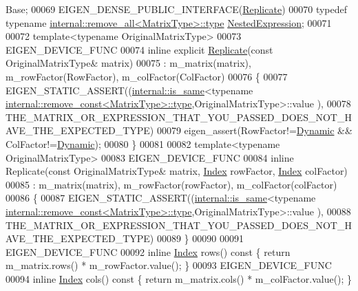 \begin{DoxyCode}
      Base;
00069     EIGEN\_DENSE\_PUBLIC\_INTERFACE(\hyperlink{group___core___module_class_eigen_1_1_replicate}{Replicate})
00070     \textcolor{keyword}{typedef} \textcolor{keyword}{typename} \hyperlink{group___sparse_core___module}{internal::remove\_all<MatrixType>::type} 
      \hyperlink{group___sparse_core___module}{NestedExpression};
00071 
00072     \textcolor{keyword}{template}<\textcolor{keyword}{typename} OriginalMatrixType>
00073     EIGEN\_DEVICE\_FUNC
00074     \textcolor{keyword}{inline} \textcolor{keyword}{explicit} \hyperlink{group___core___module_class_eigen_1_1_replicate}{Replicate}(\textcolor{keyword}{const} OriginalMatrixType& matrix)
00075       : m\_matrix(matrix), m\_rowFactor(RowFactor), m\_colFactor(ColFactor)
00076     \{
00077       EIGEN\_STATIC\_ASSERT((\hyperlink{struct_eigen_1_1internal_1_1is__same}{internal::is\_same}<\textcolor{keyword}{typename} 
      \hyperlink{group___sparse_core___module}{internal::remove\_const<MatrixType>::type},OriginalMatrixType>::value
      ),
00078                           THE\_MATRIX\_OR\_EXPRESSION\_THAT\_YOU\_PASSED\_DOES\_NOT\_HAVE\_THE\_EXPECTED\_TYPE)
00079       eigen\_assert(RowFactor!=\hyperlink{namespace_eigen_ad81fa7195215a0ce30017dfac309f0b2}{Dynamic} && ColFactor!=\hyperlink{namespace_eigen_ad81fa7195215a0ce30017dfac309f0b2}{Dynamic});
00080     \}
00081 
00082     \textcolor{keyword}{template}<\textcolor{keyword}{typename} OriginalMatrixType>
00083     EIGEN\_DEVICE\_FUNC
00084     \textcolor{keyword}{inline} Replicate(\textcolor{keyword}{const} OriginalMatrixType& matrix, \hyperlink{namespace_eigen_a62e77e0933482dafde8fe197d9a2cfde}{Index} rowFactor, 
      \hyperlink{namespace_eigen_a62e77e0933482dafde8fe197d9a2cfde}{Index} colFactor)
00085       : m\_matrix(matrix), m\_rowFactor(rowFactor), m\_colFactor(colFactor)
00086     \{
00087       EIGEN\_STATIC\_ASSERT((\hyperlink{struct_eigen_1_1internal_1_1is__same}{internal::is\_same}<\textcolor{keyword}{typename} 
      \hyperlink{group___sparse_core___module}{internal::remove\_const<MatrixType>::type},OriginalMatrixType>::value
      ),
00088                           THE\_MATRIX\_OR\_EXPRESSION\_THAT\_YOU\_PASSED\_DOES\_NOT\_HAVE\_THE\_EXPECTED\_TYPE)
00089     \}
00090 
00091     EIGEN\_DEVICE\_FUNC
00092     \textcolor{keyword}{inline} \hyperlink{namespace_eigen_a62e77e0933482dafde8fe197d9a2cfde}{Index} rows()\textcolor{keyword}{ const }\{ \textcolor{keywordflow}{return} m\_matrix.rows() * m\_rowFactor.value(); \}
00093     EIGEN\_DEVICE\_FUNC
00094     \textcolor{keyword}{inline} \hyperlink{namespace_eigen_a62e77e0933482dafde8fe197d9a2cfde}{Index} cols()\textcolor{keyword}{ const }\{ \textcolor{keywordflow}{return} m\_matrix.cols() * m\_colFactor.value(); \}

\end{DoxyCode}
